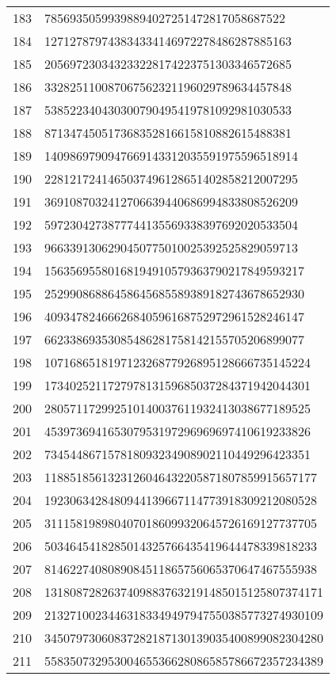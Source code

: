 \documentclass[12pt]{article}
\begin{document}
\begin{tabular}{l|l}
183 & 78569350599398894027251472817058687522 \\
184 & 127127879743834334146972278486287885163 \\
185 & 205697230343233228174223751303346572685 \\
186 & 332825110087067562321196029789634457848 \\
187 & 538522340430300790495419781092981030533 \\
188 & 871347450517368352816615810882615488381 \\
189 & 1409869790947669143312035591975596518914 \\
190 & 2281217241465037496128651402858212007295 \\
191 & 3691087032412706639440686994833808526209 \\
192 & 5972304273877744135569338397692020533504 \\
193 & 9663391306290450775010025392525829059713 \\
194 & 15635695580168194910579363790217849593217 \\
195 & 25299086886458645685589389182743678652930 \\
196 & 40934782466626840596168752972961528246147 \\
197 & 66233869353085486281758142155705206899077 \\
198 & 107168651819712326877926895128666735145224 \\
199 & 173402521172797813159685037284371942044301 \\
200 & 280571172992510140037611932413038677189525 \\
201 & 453973694165307953197296969697410619233826 \\
202 & 734544867157818093234908902110449296423351 \\
203 & 1188518561323126046432205871807859915657177 \\
204 & 1923063428480944139667114773918309212080528 \\
205 & 3111581989804070186099320645726169127737705 \\
206 & 5034645418285014325766435419644478339818233 \\
207 & 8146227408089084511865756065370647467555938 \\
208 & 13180872826374098837632191485015125807374171 \\
209 & 21327100234463183349497947550385773274930109 \\
210 & 34507973060837282187130139035400899082304280 \\
211 & 55835073295300465536628086585786672357234389 \\

\end{tabular}
\end{document}
